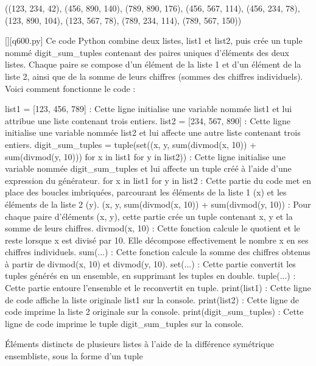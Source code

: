 ((123, 234, 42), (456, 890, 140), (789, 890, 176), (456, 567, 114), (456, 234, 78), (123, 890, 104), (123, 567, 78), (789, 234, 114), (789, 567, 150))
        \par
        \begin{solution}
            \renewcommand{\nomfichier}{q600.py}
            \pythonfile{\chemincode \nomfichier}[][\nomfichier]
            Ce code Python combine deux listes, list1 et list2, puis crée un tuple nommé digit\_sum\_tuples contenant des paires uniques d'éléments des deux listes. Chaque paire se compose d'un élément de la liste 1 et d'un élément de la liste 2, ainsi que de la somme de leurs chiffres (sommes des chiffres individuels). Voici comment fonctionne le code :

    list1 = [123, 456, 789] : Cette ligne initialise une variable nommée list1 et lui attribue une liste contenant trois entiers.
    list2 = [234, 567, 890] : Cette ligne initialise une variable nommée list2 et lui affecte une autre liste contenant trois entiers.
    digit\_sum\_tuples = tuple(set((x, y, sum(divmod(x, 10)) + sum(divmod(y, 10))) for x in list1 for y in list2)) : Cette ligne initialise une variable nommée digit\_sum\_tuples et lui affecte un tuple créé à l'aide d'une expression du générateur.
        for x in list1 for y in list2 : Cette partie du code met en place des boucles imbriquées, parcourant les éléments de la liste 1 (x) et les éléments de la liste 2 (y).
        (x, y, sum(divmod(x, 10)) + sum(divmod(y, 10)) : Pour chaque paire d'éléments (x, y), cette partie crée un tuple contenant x, y et la somme de leurs chiffres.
            divmod(x, 10) : Cette fonction calcule le quotient et le reste lorsque x est divisé par 10. Elle décompose effectivement le nombre x en ses chiffres individuels.
            sum(...) : Cette fonction calcule la somme des chiffres obtenus à partir de divmod(x, 10) et divmod(y, 10).
        set(...) : Cette partie convertit les tuples générés en un ensemble, en supprimant les tuples en double.
        tuple(...) : Cette partie entoure l'ensemble et le reconvertit en tuple.
    print(list1) : Cette ligne de code affiche la liste originale list1 sur la console.
    print(list2) : Cette ligne de code imprime la liste 2 originale sur la console.
    print(digit\_sum\_tuples) : Cette ligne de code imprime le tuple digit\_sum\_tuples sur la console.
        \end{solution}
        

        \question
        Éléments distincts de plusieurs listes à l'aide de la différence symétrique ensembliste, sous la forme d'un tuple

